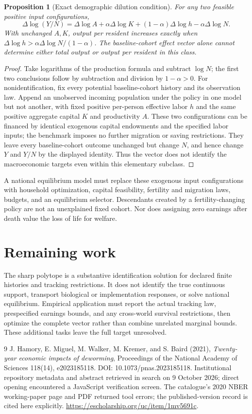 \documentclass[11pt]{article}
\newtheorem{proposition}[theorem]{Proposition}
\theoremstyle{remark}
\begin{document}
\begin{proposition}[Exact demographic dilution condition]
For any two feasible positive input configurations,
\[
 \Delta\log(Y/N)=\Delta\log A+\alpha\Delta\log K
                    +(1-\alpha)\Delta\log h-\alpha\Delta\log N.
\]
With unchanged $A,K$, output per resident increases exactly when
$\Delta\log h>\alpha\Delta\log N/(1-\alpha)$. The baseline-cohort effect vector alone cannot determine either total output or output per resident in this class.
\end{proposition}
\begin{proof}
Take logarithms of the production formula and subtract $\log N$; the first two conclusions follow by subtraction and division by $1-\alpha>0$. For nonidentification, fix every potential baseline-cohort history and its observation law. Append an unobserved incoming population under the policy in one model but not another, with fixed positive per-person effective labor $h$ and the same positive aggregate capital $K$ and productivity $A$. These two configurations can be financed by identical exogenous capital endowments and the specified labor inputs; the benchmark imposes no further migration or saving restrictions. They leave every baseline-cohort outcome unchanged but change $N$, and hence change $Y$ and $Y/N$ by the displayed identity. Thus the vector does not identify the macroeconomic targets even within this elementary subclass.
\end{proof}

A national equilibrium model must replace these exogenous input configurations with household optimization, capital feasibility, fertility and migration laws, budgets, and an equilibrium selector. Descendants created by a fertility-changing policy are not an unexplained fixed cohort. Nor does assigning zero earnings after death value the loss of life for welfare.

\section{Remaining work}
The sharp polytope is a substantive identification solution for declared finite histories and tracking restrictions. It does not identify the true continuous support, transport biological or implementation responses, or solve national equilibrium. Empirical application must report the actual tracking law, prespecified earnings bounds, and any cross-world survival restrictions, then optimize the complete vector rather than combine unrelated marginal bounds. These additional tasks leave the full target unresolved.

\begin{thebibliography}{9}
 J. Hamory, E. Miguel, M. Walker, M. Kremer, and S. Baird (2021), \emph{Twenty-year economic impacts of deworming}, Proceedings of the National Academy of Sciences 118(14), e2023185118. DOI: 10.1073/pnas.2023185118. Institutional repository metadata and abstract retrieved in search on 9 October 2026; direct opening encountered a JavaScript verification screen. The catalogue's 2020 NBER working-paper page and PDF returned tool errors; the published-version record is cited here explicitly. \url{https://escholarship.org/uc/item/1mv5691c}.
\end{thebibliography}
\end{document}
